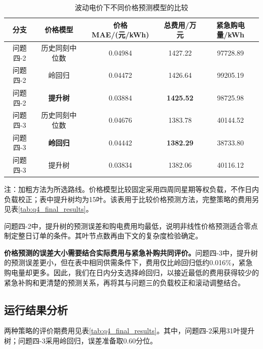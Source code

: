 \begin{table}[!htbp]
    \centering
    \caption{波动电价下不同价格预测模型的比较}
    \label{tab:q4_price_comparison}
    \begin{tabular}{ccccc}
        \hline
        分支 & 价格模型 & 价格MAE/(元/kWh) & 总费用/万元 & 紧急购电量/kWh \\
        \hline
        问题四-2 & 历史同刻中位数 & 0.04984 & 1427.22 & 97728.89 \\
        问题四-2 & 岭回归 & 0.04472 & 1426.64 & 99205.19 \\
        问题四-2 & \textbf{提升树} & 0.03884 & \textbf{1425.52} & 98725.98 \\
        \hline
        问题四-3 & 历史同刻中位数 & 0.04676 & 1383.78 & 40144.52 \\
        问题四-3 & \textbf{岭回归} & 0.04442 & \textbf{1382.29} & 38733.80 \\
        问题四-3 & 提升树 & 0.03834 & 1382.06 & 40116.12 \\
        \hline
    \end{tabular}
    \par\smallskip
    \begin{minipage}{0.96\textwidth}
    \small 注：加粗方法为所选路线。价格模型比较固定采用四周同星期等权负载，不作日内负载校正；表中提升树均为15叶。该表用于比较价格预测方法，完整策略的费用另见表\ref{tab:q4_final_results}。
    \end{minipage}
\end{table}

问题四-2中，提升树的预测误差和购电费用均最低，说明非线性价格预测适合零点制定整日订单的条件。其叶节点数再由下文的复杂度检验确定。

\textbf{价格预测的误差大小需要结合实际费用与紧急补购共同评价。}问题四-3中，提升树的预测误差更小，但在表中相同供需条件下，费用仅比岭回归低约0.016\%，紧急购电量却更多。因此，我们在日内分支选择岭回归，以接近最低的费用获得较少的紧急补购和更清楚的预测关系，再将其与问题三的负载校正和滚动调整结合。

\subsection{运行结果分析}

两种策略的评价期费用见表\ref{tab:q4_final_results}。其中，问题四-2采用31叶提升树；问题四-3采用岭回归，误差准备取0.60分位。

